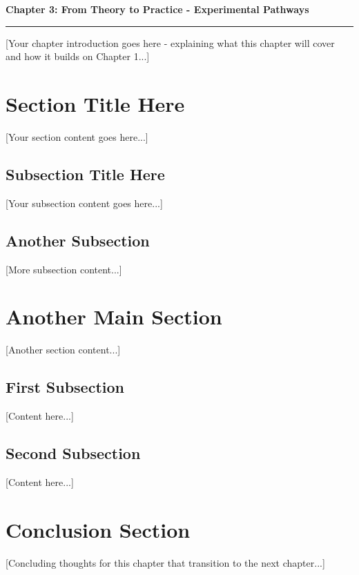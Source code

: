 \clearpage


\setcounter{chapter}{2}
\setcounter{section}{0}


\pagestyle{fancy}
\fancyhf{} %
\fancyfoot[C]{\thepage} %
\renewcommand{\headrulewidth}{0pt}
\renewcommand{\footrulewidth}{0pt}

\noindent
{\Large\textbf{Chapter 3: From Theory to Practice - Experimental Pathways}}
\vspace{0.3cm}
\hrule
\vspace{0.8cm}
\label{ch:democratization}

\setlength{\parindent}{0pt}

[Your chapter introduction goes here - explaining what this chapter will cover and how it builds on Chapter 1...]

\section{Section Title Here}

[Your section content goes here...]

\subsection{Subsection Title Here}

[Your subsection content goes here...]

\subsection{Another Subsection}

[More subsection content...]

\section{Another Main Section}

[Another section content...]

\subsection{First Subsection}

[Content here...]

\subsection{Second Subsection}

[Content here...]

\section{Conclusion Section}

[Concluding thoughts for this chapter that transition to the next chapter...]